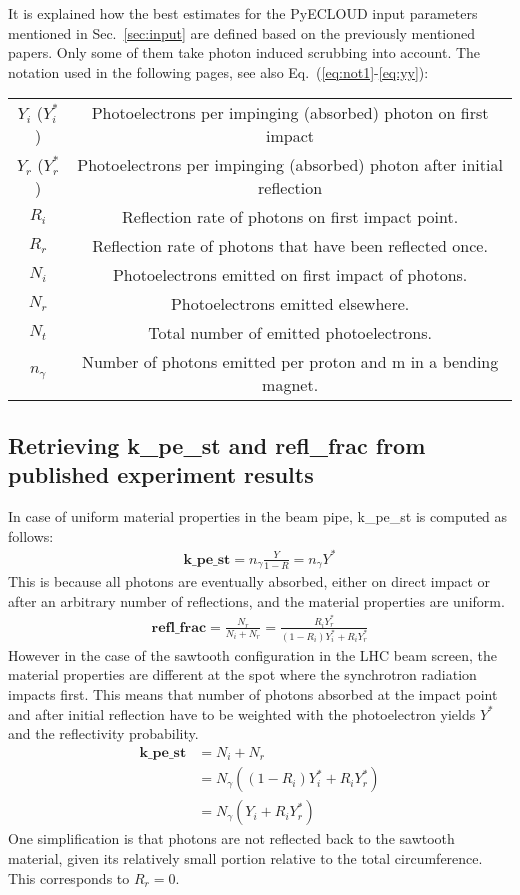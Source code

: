 
It is explained how the best estimates for the PyECLOUD input parameters mentioned in Sec.~\ref{sec:input} are defined based on the previously mentioned papers.
Only some of them take photon induced scrubbing into account.
The notation used in the following pages, see also Eq.~(\ref{eq:not1}-\ref{eq:yy}):
\begin{center}
    \begin{tabular}{cc}
        $Y_i$ ($Y_i^*$) & Photoelectrons per impinging (absorbed) photon on first impact \\
        $Y_r$ ($Y_r^*$)& Photoelectrons per impinging (absorbed) photon after initial reflection \\
        $R_i$ & Reflection rate of photons on first impact point. \\
        $R_r$ & Reflection rate of photons that have been reflected once. \\
        $N_i$ & Photoelectrons emitted on first impact of photons. \\
        $N_r$ & Photoelectrons emitted elsewhere. \\
        $N_t$ & Total number of emitted photoelectrons.\\
        $n_\gamma$ & Number of photons emitted per proton and m in a bending magnet.
    \end{tabular}
\end{center}


\subsection{Retrieving k\_pe\_st and refl\_frac from published experiment results}

In case of uniform material properties in the beam pipe, k\_pe\_st is computed as follows:
\begin{align}
    \textbf{k\_pe\_st} = n_\gamma \frac{Y}{1-R} = n_\gamma Y^*
\end{align}
This is because all photons are eventually absorbed, either on direct impact or after an arbitrary number of reflections, and the material properties are uniform.
\begin{align}
    \textbf{refl\_frac} = \frac{N_r}{N_i+N_r} = \frac{R_iY^*_r}{(1-R_i)Y_i^* + R_iY^*_r}
\end{align}
However in the case of the sawtooth configuration in the LHC beam screen, the material properties are different at the  spot where the synchrotron radiation impacts first.
This means that number of photons absorbed at the impact point and after initial reflection have to be weighted with the photoelectron yields $Y^*$ and the reflectivity probability.
\begin{align}
    \textbf{k\_pe\_st} &= N_i + N_r
    \\
    &= N_\gamma \left( (1-R_i)Y_i^* + R_iY^*_r \right)
    \\
    &= N_\gamma \left( Y_i + R_iY^*_r \right)
    \label{eq:parts}
\end{align}
One simplification is that photons are not reflected back to the sawtooth material, given its relatively small portion relative to the total circumference.
This corresponds to $R_r=0$.

